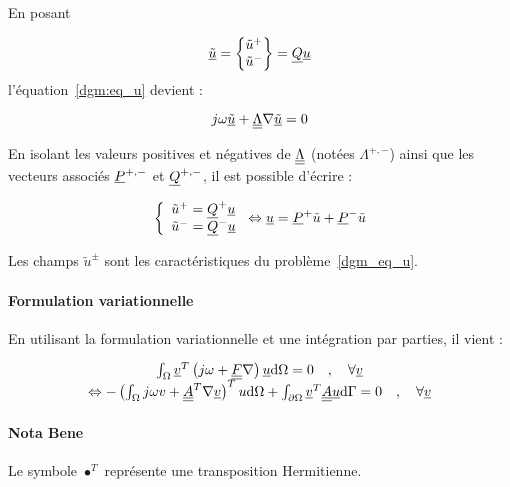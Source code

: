 En posant

\begin{equation}
    \underline{\tilde{u}} = \begin{Bmatrix}\tilde{u}^+\\\tilde{u}^-\end{Bmatrix} = \underline{Q}\underline{u}\label{dgm:utilde}
\end{equation}
l'équation~\eqref{dgm:eq_u} devient :

\begin{equation*}
    j\omega \underline{\tilde{u}} + \underline{\underline{\Lambda}}\nabla\underline{\tilde{u}} = 0
\end{equation*}

En isolant les valeurs positives et négatives de $\underline{\underline{\Lambda}}$  (notées $\Lambda^{+,-}$) ainsi que les vecteurs
associés $\underline{P}^{+,-}$ et $\underline{Q}^{+,-}$, il est possible d'écrire :

\begin{equation}
    \left\{\begin{array}{l}
        \tilde{u}^+ = \underline{Q}^+\underline{u}\\
        \tilde{u}^- = \underline{Q}^-\underline{u}
    \end{array}\right. \Leftrightarrow
    \underline{u} = \underline{P}^+\tilde{u} + \underline{P}^-\tilde{u} \label{dgm:sep_u}
\end{equation}

Les champs $\tilde{u}^\pm$ sont les caractéristiques du problème~\eqref{dgm_eq_u}.


\paragraph{Formulation variationnelle}

En utilisant la formulation variationnelle et une intégration par parties, il vient :

\begin{equation}
    \begin{array}{c}
    \int_\Omega \underline{v}^T\left(j\omega + \underline{\underline{F}}\nabla\right)\underline{u}\mathrm{d}\Omega = 0 \quad,\quad \forall\underline{v}\\
    \Leftrightarrow -\left(\int_\Omega j\omega v + \underline{\underline{A}}^T\nabla\underline{v}\right)^Tu\mathrm{d}\Omega +
        \int_{\partial\Omega}\underline{v}^T\underline{\underline{A}}\underline{u}\mathrm{d}\Gamma = 0 \quad,\quad \forall\underline{v}
    \end{array}
    \label{dgm:post_ipp}
\end{equation}

\paragraph{Nota Bene} Le symbole $\bullet^T$ représente une transposition Hermitienne.

